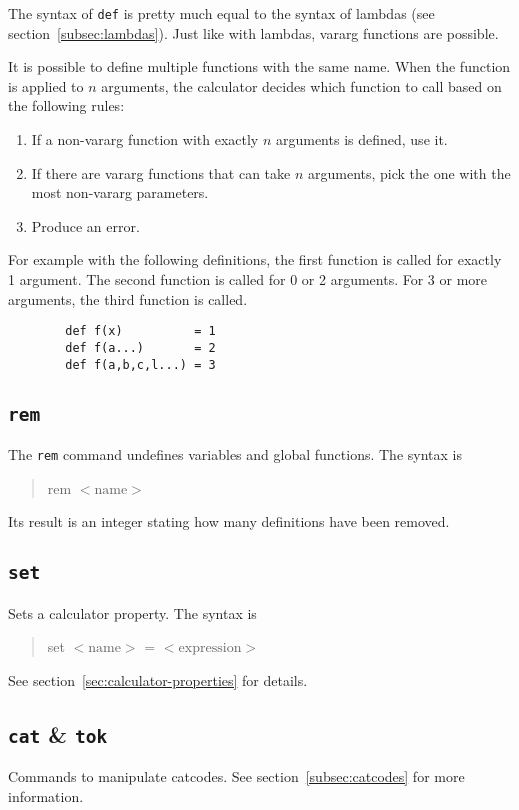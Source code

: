 \documentclass[10pt]{article}
\newcommand{\argument}[1]{{${\big<}\mathrm{#1}{\big>}$}}
\newenvironment{code}{\begin{quote}\ttfamily}{\end{quote}}
\begin{document}
    The syntax of \verb|def| is pretty much equal to the syntax of lambdas (see section~\ref{subsec:lambdas}).
    Just like with lambdas, vararg functions are possible.
    
    It is possible to define multiple functions with the same name.
    When the function is applied to $ n $ arguments, the calculator decides which function to call based on the following rules:
    \begingroup
    \setlength{\parskip}{0pt}
    \begin{enumerate}
        \item If a non-vararg function with exactly $ n $ arguments is defined, use it.
        \item If there are vararg functions that can take $ n $ arguments, pick the one with the most non-vararg parameters.
        \item Produce an error.
    \end{enumerate}
    \endgroup
    For example with the following definitions, the first function is called for exactly 1 argument.
    The second function is called for 0 or 2 arguments.
    For 3 or more arguments, the third function is called.
    \begin{verbatim}
        def f(x)          = 1
        def f(a...)       = 2
        def f(a,b,c,l...) = 3
    \end{verbatim}
    
    \subsection{\texttt{rem}}\label{subsec:cmd-rem}
    The \verb|rem| command undefines variables and global functions.
    The syntax is
    \begin{code}
        rem \argument{name}
    \end{code}
    Its result is an integer stating how many definitions have been removed.
    
    \subsection{\texttt{set}}\label{subsec:cmd-set}
    Sets a calculator property.
    The syntax is
    \begin{code}
        set \argument{name} = \argument{expression}
    \end{code}
    See section~\ref{sec:calculator-properties} for details.
    
    \subsection{\texttt{cat} \& \texttt{tok}}\label{subsec:cmd-cat-tok}
    Commands to manipulate catcodes.
    See section~\ref{subsec:catcodes} for more information.
    
\end{document}

